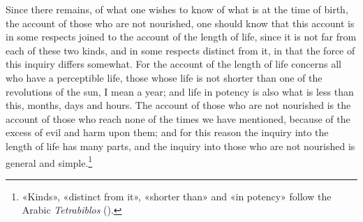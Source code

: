 \documentclass[11pt]{article}
\newcommand{\Fol}[1]{\marginpar{\footnotesize\color{gray}f.\,#1}}
\begin{document}
\par \Fol{43r}Since there remains, of what one wishes to know of what is at the time of birth, the account of those who are not nourished, one should know that this account is in some respects joined to the account of the length of life, since it is not far from each of these two kinds, and in some respects distinct from it, in that the force of this inquiry differs somewhat. For the account of the length of life concerns all who have a perceptible life, those whose life is not shorter than one of the revolutions of the sun, I mean a year; and life in potency is also what is less than this, months, days and hours. The account of those who are not nourished is the account of those who reach none of the times we have mentioned, because of the excess of evil and harm upon them; and for this reason the inquiry into the length of life has many parts, and the inquiry into those who are not nourished is general and simple.\footnote{«Kinds», «distinct from it», «shorter than» and «in potency» follow the Arabic \emph{Tetrabiblos} ().}\par
\end{document}
